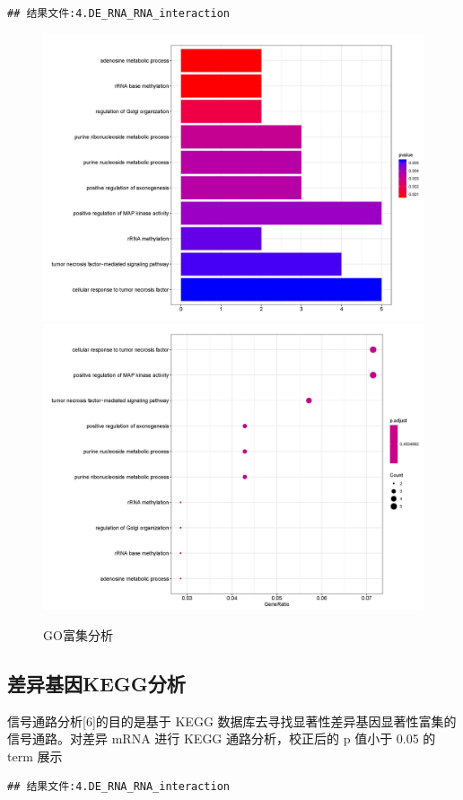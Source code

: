 \documentclass[
]{ctexart}
\begin{document}
\begin{verbatim}
## 结果文件:4.DE_RNA_RNA_interaction
\end{verbatim}

\begin{figure}[H]

{\centering \includegraphics[width=0.48\linewidth]{./1.picture/TVSC_for_cluster_geneBPbar} \includegraphics[width=0.48\linewidth]{./1.picture/TVSC_for_cluster_geneBPdot} 

}

\caption{GO富集分析}\label{fig:unnamed-chunk-11}
\end{figure}

\hypertarget{ux5deeux5f02ux57faux56e0keggux5206ux6790}{%
\subsection{差异基因KEGG分析}\label{ux5deeux5f02ux57faux56e0keggux5206ux6790}}

信号通路分析{[}6{]}的目的是基于 KEGG 数据库去寻找显著性差异基因显著性富集的信号通路。对差异 mRNA 进行 KEGG 通路分析，校正后的 p 值小于 0.05 的 term 展示

\begin{verbatim}
## 结果文件:4.DE_RNA_RNA_interaction
\end{verbatim}
\end{document}
